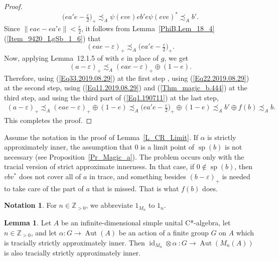 \documentclass[10pt]{amsart}
\numberwithin{equation}{section}
\theoremstyle{definition}
\newtheorem{lem}[thm]{Lemma}
\newtheorem{ntn}[thm]{Notation}
\newcommand{\ep}{\varepsilon}
\newcommand{\N}{{\mathbb{Z}}_{> 0}}
\newcommand{\id}{{\operatorname{id}}}
\newcommand{\spec}{{\operatorname{sp}}}
\newcommand{\Aut}{{\operatorname{Aut}}}
\newcommand{\ca}{C*-algebra}
\begin{document}
\begin{proof}
\begin{equation}\label{Eq11.2019.08.29}
\big(e a' e - \tfrac{\ep}{2}\big)_+ \precsim_{A} \psi ( e v e ) e b'  e \psi (e v e)^*  \precsim_A b'.
\end{equation}
Since $\| e a e - e a' e \| < \tfrac{\ep}{2}$,
 it follows from Lemma~\ref{PhiB.Lem_18_4}(\ref{Item_9420_LgSb_1_6}) that 
\begin{equation}\label{Eq22.2019.08.29}
(e a e - \ep)_+ \precsim_A \big(e a' e - \tfrac{\ep}{2} \big)_+.
\end{equation}
Now, applying Lemma~12.1.5 of \cite{GKPT18} with $e$ in place of $g$, we get 
\begin{equation}\label{Eq33.2019.08.29}
(a - \ep)_+ \precsim_A ( e a e - \ep)_+ \oplus (1 - e).
\end{equation}
Therefore, using (\ref{Eq33.2019.08.29}) at the first step ,
using (\ref{Eq22.2019.08.29}) at the second step, 
using (\ref{Eq11.2019.08.29}) and (\ref{Thm_magic_b.444}) at the third step, 
and using the third part of (\ref{Eq1.190711}) at the last step,
\begin{align*}
(a - \ep)_+ \precsim_A ( e a e - \ep)_+ \oplus (1 - e)
\precsim_A
\big(e a' e - \tfrac{\ep}{2} \big)_+ \oplus (1 - e)
\precsim_A
b' \oplus f(b)
\precsim_A
b. 
\end{align*}
This completes the proof.
\end{proof}
%
Assume the notation in the proof of Lemma~\ref{L_CR_Limit}.
If $\alpha$ is strictly approximately inner, 
the assumption that $0$ is a limit point of $\spec (b)$ is not necessary (see Proposition~\ref{Pr_Magic_a}).
The problem occurs only with the tracial version of strict approximate innerness. 
In that case, if $0 \not\in \spec (b)$, then $v b v^*$ does not  cover all of $a$ in trace, and something besides
$(b - \ep)_{+}$ is needed to take care of the part of $a$ that is
missed. That is what $f(b)$ does.
%
\begin{ntn}
\label{NTN1.20200702}
For $n\in \N$, we abbreviate $1_{M_{n}}$ to $1_n$.
\end{ntn}
%
\begin{lem}\label{L_EXt_T.S.A.I}
Let $A$ be an infinite-dimensional simple   unital  \ca, let $n \in \N$, and 
let $\alpha \colon  G \to \Aut(A)$  be an action of a finite group $G$ on $A$ 
which is  tracially  strictly approximately inner.
Then $\id_{M_n} \otimes \alpha\ \colon G \to \Aut (M_n (A))$ is also tracially strictly  approximately inner. 
\end{lem}
\end{document}
